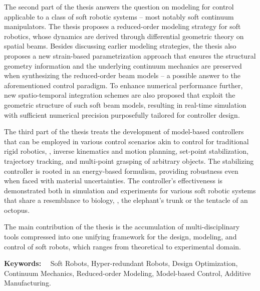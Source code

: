 The second part of the thesis answers the question on modeling for control applicable to a class of soft robotic systems -- most notably soft continuum manipulators. The thesis proposes a reduced-order modeling strategy for soft robotics, whose dynamics are derived through differential geometric theory on spatial beams. Besides discussing earlier modeling strategies, the thesis also proposes a new strain-based parametrization approach that ensures the structural geometry information and the underlying continuum mechanics are preserved when synthesizing the reduced-order beam models -- a possible answer to the aforementioned control paradigm. To enhance numerical performance further, new spatio-temporal integration schemes are also proposed that exploit the geometric structure of such soft beam models, resulting in real-time simulation with sufficient numerical precision purposefully tailored for controller design.

The third part of the thesis treats the development of model-based controllers that can be employed in various control scenarios akin to control for traditional rigid robotics, \eg, inverse kinematics and motion planning, set-point stabilization, trajectory tracking, and multi-point grasping of arbitrary objects. The stabilizing controller is rooted in an energy-based formulism, providing robustness even when faced with material uncertainties. The controller's effectiveness is demonstrated both in simulation and experiments for various soft robotic systems that share a resemblance to biology, \eg, the elephant's trunk or the tentacle of an octopus.

The main contribution of the thesis is the accumulation of multi-disciplinary tools compressed into one unifying framework for the design, modeling, and control of soft robots, which ranges from theoretical to experimental domain.

\vspace*{5pt}\noindent
\textbf{Keywords:} \ \ Soft Robots, Hyper-redundant Robots, Design Optimization, Continuum Mechanics, Reduced-order Modeling, Model-based Control, Additive Manufacturing.

